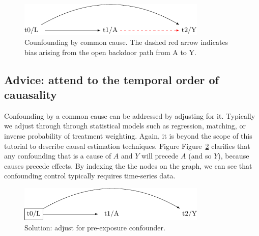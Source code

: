 \documentclass[
  singlecolumn]{report}
\begin{document}
\begin{figure}

{\centering \includegraphics[width=0.8\textwidth,height=\textheight]{causal-dags_files/figure-pdf/fig-dag-common-cause-1.pdf}

}

\caption{\label{fig-dag-common-cause}Counfounding by common cause. The
dashed red arrow indicates bias arising from the open backdoor path from
A to Y.}

\end{figure}

\hypertarget{advice-attend-to-the-temporal-order-of-cauasality}{%
\subsection{Advice: attend to the temporal order of
cauasality}\label{advice-attend-to-the-temporal-order-of-cauasality}}

Confounding by a common cause can be addressed by adjusting for it.
Typically we adjust through through statistical models such as
regression, matching, or inverse probability of treatment weighting.
Again, it is beyond the scope of this tutorial to describe causal
estimation techniques. Figure Figure~\ref{fig-dag-common-cause-solution}
clarifies that any confounding that is a cause of \(A\) and \(Y\) will
precede \(A\) (and so \(Y\)), because causes precede effects. By
indexing the the nodes on the graph, we can see that confounding control
typically requires time-series data.

\begin{figure}

{\centering \includegraphics[width=0.8\textwidth,height=\textheight]{causal-dags_files/figure-pdf/fig-dag-common-cause-solution-1.pdf}

}

\caption{\label{fig-dag-common-cause-solution}Solution: adjust for
pre-exposure confounder.}

\end{figure}
\end{document}

